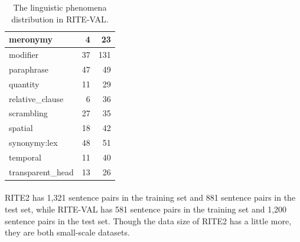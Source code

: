 \documentclass{article}
\begin{document}
\begin{CJK*}{UTF8}{bkai}
\begin{table}[ht!]
{\begin{tabular}{|l|r|r|}
      meronymy & 4 & 23 \\ \hline
      modifier & 37 & 131 \\ \hline
      paraphrase & 47 & 49 \\ \hline
      quantity & 11 & 29 \\ \hline
      relative\_clause & 6 & 36 \\ \hline
      scrambling & 27 & 35 \\ \hline
      spatial & 18 & 42 \\ \hline
      synonymy:lex & 48 & 51 \\ \hline
      temporal & 11 & 40 \\ \hline
      transparent\_head & 13 & 26 \\ \hline
    \end{tabular}
  }
  \quad
  \caption{The linguistic phenomena distribution in RITE-VAL.}
  \label{tab:linguistic_phenomenon}
\end{table}

\paragraph{}
RITE2 has 1,321 sentence pairs in the training set and 881 sentence pairs in the test set, while RITE-VAL has 581 sentence pairs in the training set and 1,200 sentence pairs in the test set. Though the data size of RITE2 has a little more, they are both small-scale datasets.


\end{CJK*}
\end{document}
